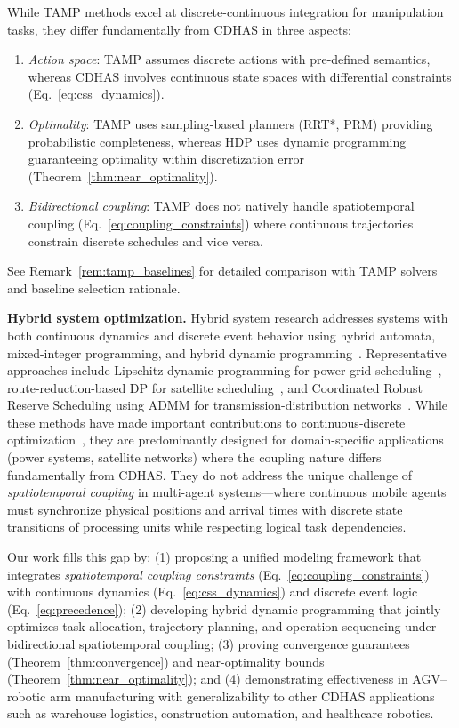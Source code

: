 \documentclass[manuscript,screen,review]{acmart}
\begin{document}
While TAMP methods excel at discrete-continuous integration for manipulation 
tasks, they differ fundamentally from CDHAS in three aspects:
\begin{enumerate}[leftmargin=*, itemsep=2pt]
    \item \textit{Action space}: TAMP assumes discrete actions with pre-defined 
    semantics, whereas CDHAS involves continuous state spaces with differential 
    constraints (Eq.~\ref{eq:css_dynamics}).
    
    \item \textit{Optimality}: TAMP uses sampling-based planners (RRT*, PRM) 
    providing probabilistic completeness, whereas HDP uses dynamic programming 
    guaranteeing optimality within discretization error 
    (Theorem~\ref{thm:near_optimality}).
    
    \item \textit{Bidirectional coupling}: TAMP does not natively handle 
    spatiotemporal coupling (Eq.~\ref{eq:coupling_constraints}) where 
    continuous trajectories constrain discrete schedules and vice versa.
\end{enumerate}
See Remark~\ref{rem:tamp_baselines} for detailed comparison with TAMP solvers 
and baseline selection rationale.

\textbf{Hybrid system optimization.} Hybrid system research addresses systems
with both continuous dynamics and discrete event behavior using hybrid automata,
mixed-integer programming, and hybrid dynamic programming~\cite{lin2022hybrid}. Representative approaches include Lipschitz dynamic 
programming for power grid scheduling~\cite{shen2022coordinated}, 
route-reduction-based DP for satellite scheduling~\cite{liu2019route}, and 
Coordinated Robust Reserve Scheduling using ADMM for transmission-distribution 
networks~\cite{chen2020fully}. While these methods have made important 
contributions to continuous-discrete optimization~\cite{ansari2023review}, they are predominantly 
designed for domain-specific applications (power systems, satellite networks) 
where the coupling nature differs fundamentally from CDHAS. They do not address 
the unique challenge of \textit{spatiotemporal coupling} in multi-agent 
systems—where continuous mobile agents must synchronize physical positions and 
arrival times with discrete state transitions of processing units while 
respecting logical task dependencies.

Our work fills this gap by: (1) proposing a unified modeling framework that 
integrates \textit{spatiotemporal coupling constraints} (Eq.~\ref{eq:coupling_constraints}) 
with continuous dynamics (Eq.~\ref{eq:css_dynamics}) and discrete event logic 
(Eq.~\ref{eq:precedence}); (2) developing hybrid dynamic programming that 
jointly optimizes task allocation, trajectory planning, and operation sequencing 
under bidirectional spatiotemporal coupling; (3) proving convergence guarantees 
(Theorem~\ref{thm:convergence}) and near-optimality bounds 
(Theorem~\ref{thm:near_optimality}); and (4) demonstrating effectiveness in 
AGV--robotic arm manufacturing with generalizability to other CDHAS applications 
such as warehouse logistics, construction automation, and healthcare robotics.
\end{document}
